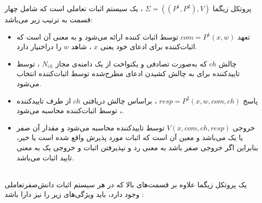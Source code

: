  پروتکل زیگما 
$\Sigma = ((P^1,P^2),V)$
، یک سیستم اثبات تعاملی است که شامل چهار قسمت به ترتیب زیر می‌باشد:
\begin{itemize}
\item 
 تعهد
$com = P^1(x,w)$
 توسط اثبات کننده ارائه می‌شود و به معنی آن است که اثبات‌کننده برای ادعای خود یعنی
 $x$
 ، شاهد 
 $w$
 را دراخنیار دارد.
\item 
 چالش 
$ch$
که به‌صورت  تصادفی و یکنواخت از یک دامنه‌ی مجاز
$N_{ch}$
، توسط تاییدکننده برای به چالش کشیدن ادعای مطرح‌شده توسط اثبات‌کننده انتخاب می‌شود. 
\item 
 پاسخ 
$resp = P^2(x,w,com,ch)$
 ، براساس چالش دریافتی  
$ch$
از طرف تایید‌کننده ، توسط اثبات‌کننده محاسبه می‌شود.
\item
خروجی 
$V(x,com,ch,resp)$
 توسط تاییدکننده محاسبه می‌شود و مقدار آن  صفر یا یک می‌باشد و معین آن است که  اثبات مورد پذیرش  واقع شده است یا خیر، بنابراین اگر خروجی صفر باشد به معنی رد و نپذیرفتن اثبات و خروجی یک به معنی تایید اثبات می‌باشد. 
	
\end{itemize}~
\\
 یک پروتکل زیگما علاوه بر قسمت‌های بالا که در هر سیستم اثبات دانش‌صفر‌تعاملی وجود دارد، باید ویژگی‌های زیر را نیز دارا باشد :

